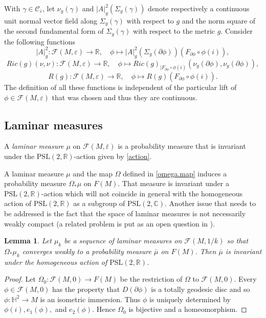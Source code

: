 \documentclass[11pt]{amsart}
\def\R{\mathbb R}
\def\H{\mathbb H}
\def\C{\mathbb C}
\newtheorem{lemm}[thm]{Lemma}
\theoremstyle{remark}
\theoremstyle{definition}
\begin{document}
{{	
	With $\gamma\in\mathcal C_{\bar \varepsilon}$,  let  $\nu_g(\gamma)$ and  $|A|_g^2(\Sigma_{g}(\gamma))$ denote respectively a  continuous unit normal vector field along $\Sigma_g(\gamma)$ with respect to $g$ and the norm square of the second fundamental form of $\Sigma_{g}(\gamma)$ with respect to the metric $g$. 
	Consider the following functions 
	\begin{equation}\label{fA}
		|A|_g^2:\mathcal F(M,\varepsilon)\rightarrow \R, \quad \phi\mapsto |A|_g^2(\Sigma_{g}(\partial\phi))(F_{\partial \phi}\circ\phi(i)),
	\end{equation}
	\begin{equation}\label{fRic}
		Ric(g)(\nu,\nu):\mathcal F(M,\varepsilon)\rightarrow \R, \quad \phi\mapsto Ric(g)_{|F_{\partial \phi}\circ\phi(i)}(\nu_g(\partial\phi),\nu_g(\partial\phi)),
	\end{equation}
	\begin{equation}\label{fR}
		R(g):\mathcal F(M,\varepsilon)\rightarrow \R, \quad \phi\mapsto R(g)(F_{\partial \phi}\circ\phi(i)).
	\end{equation}
	The definition of all these functions is independent of the particular lift of $\phi\in\mathcal F(M,\varepsilon)$ that was chosen and thus they are  continuous.
	
	
	\subsection{Laminar measures} A {\em laminar measure} $\mu$ on $\mathcal F(M,\bar\varepsilon)$ is a probability measure that is invariant under the $\text{PSL}(2,\R)$-action given by \eqref{action}.  
	
	
	A laminar measure $\mu$ and the map $\Omega$ defined in \eqref{omega.map} induces a probability measure $\Omega_*\mu$ on $F(M)$. That measure is invariant under a $\text{PSL}(2,\R)$-action which will not coincide in general with the homogeneous action of $\text{PSL}(2,\R)$ as a subgroup of $\text{PSL}(2,\C)$. Another issue that needs to be addressed is the fact that the space of laminar measures is not necessarily weakly compact (a related problem is put as an open question in \cite{Labourie2}).
	
	
	
	\begin{lemm}\label{compactness.lemm} Let $\mu_k$ be a sequence of   laminar measures on $\mathcal F(M,1/k)$ so that $\Omega_*\mu_k$ converges weakly to a probability measure $\bar\mu$ on $F(M)$.  Then $\bar \mu$  is  invariant under  the homogeneous action of $\text{PSL}(2,\R)$. 
	\end{lemm}
	\begin{proof}
		Let $\Omega_0:\mathcal F(M,0)\rightarrow F(M)$ be the restriction of $\Omega$ to $\mathcal F(M,0)$. Every  $\phi \in \mathcal F(M,0)$ has the property that $D(\partial\phi)$ is a totally geodesic disc and so $\phi:\H^2\rightarrow M$ is an isometric immersion. Thus $\phi$ is uniquely determined by $\phi(i), e_1(\phi),$ and $e_2(\phi)$. Hence $\Omega_0$ is bijective and a homeomorphism.
		

\end{proof}}}
\end{document}
